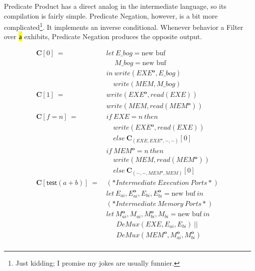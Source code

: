 \documentclass[sigconf,usenames,dvipsnames,svgnames,table]{acmart}
\newcommand{\shdtt}[1]{\sethlcolor{MyLightGrey}\texttt{\hl{#1}}}
\newcommand{\obf}[1]{#1^\mathbf{o}}
\begin{document}
        Predicate Product has a direct analog in the intermediate language, so its compilation is fairly simple.
        Predicate Negation, however, is a bit more complicated\footnote{Just kidding; I promise my jokes are usually funnier.}.
        It implements an inverse conditional.
        Whenever behavior a Filter over \shdtt{$\mathsf{a}$} exhibits, Predicate Negation produces the opposite output.

        \begin{figure}
          \begin{align*}
            \mathbf{C}[0]\ 
              =\ &
              let\    E\_bog = \text{new buf}\\
              &\quad\ M\_bog = \text{new buf}\\
              &in\ write(\obf{EXE}, E\_bog)\\
              &\quad  write(MEM, M\_bog)\\
            \mathbf{C}[1]\ 
              =\ &
              write(\obf{EXE}, read(EXE))\\
              &write(MEM, read(\obf{MEM}))
              \\
            \mathbf{C}[f = n]\
              =\
              &if\ EXE=n\ then\\
              &\quad write(\obf{EXE}, read(EXE))\\
              &\quad else\ \mathbf{C}_{(EXE, \obf{EXE}, -, -)}[0]\\
              &if\ \obf{MEM}=n\ then\\
              &\quad write(MEM, read(\obf{MEM}))\\
              &\quad else\ \mathbf{C}_{(-, -, \obf{MEM}, MEM)}[0]\\
            \mathbf{C}[\mathsf{test}(a + b)]\ 
              =\
              & (*Intermediate\ Execution\ Ports*)\\
              & let\ E_{ai}, \obf{E}_{ai}, E_{bi}, \obf{E}_{bi} = \text{new buf}\ in\\
              & (*Intermediate\ Memory\ Ports*)\\
              & let\ \obf{M}_{ai}, M_{ai}, \obf{M}_{bi}, M_{bi} = \text{new buf}\ in\\
              &\quad\ \ DeMux(EXE, E_{ai}, E_{bi})\ ||\\
              &\quad\ \ DeMux(\obf{MEM}, \obf{M}_{ai}, \obf{M}_{bi})\\

\end{align*}
\end{figure}
\end{document}
